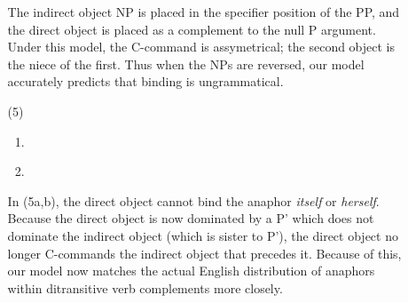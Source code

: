 \documentclass[12pt]{article}
\begin{document}
\begin{enumerate}
\begin{itemize}
\begin{enumerate}[label=\alph*.]
\end{enumerate}

The indirect object NP is placed in the specifier position of the PP, and the direct object is placed as a complement to the null P argument. Under this model, the C-command is assymetrical; the second object is the niece of the first. Thus when the NPs are reversed, our model accurately predicts that binding is ungrammatical.

\pagebreak
{}
\item[(5)]
\begin{enumerate}[label=\alph*.]
\item \leavevmode\vadjust{\vspace{-\baselineskip}}\newline
{}\\
\item \leavevmode\vadjust{\vspace{-\baselineskip}}\newline
{}

\end{enumerate}

In (5a,b), the direct object cannot bind the anaphor \emph{itself} or \emph{herself}. Because the direct object is now dominated by a P' which does not dominate the indirect object (which is sister to P'), the direct object no longer C-commands the indirect object that precedes it. Because of this, our model now matches the actual English distribution of anaphors within ditransitive verb complements more closely.


\end{itemize}
\end{enumerate}
\end{document}

